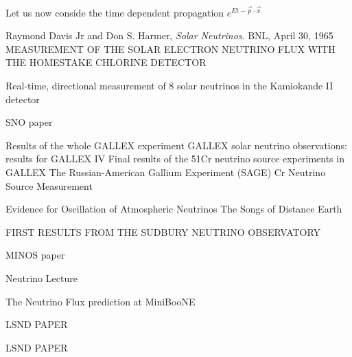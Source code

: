 \documentclass[12pt]{article}
\begin{document}
Let us now conside the time dependent propagation 
$e^{Et - \vec{p}\cdot\vec{x}}$


\begin{thebibliography}{10} %
  Raymond Davis Jr and Don S. Harmer,
  \emph{Solar Neutrinos}.
  BNL,
  April 30, 1965
  MEASUREMENT OF THE SOLAR ELECTRON NEUTRINO FLUX WITH THE HOMESTAKE
  CHLORINE DETECTOR
  
  Real-time, directional measurement of 8 solar neutrinos in the Kamiokande II detector

  SNO paper

	Results of the whole GALLEX experiment 
	GALLEX solar neutrino observations: results for GALLEX IV
	Final results of the 51Cr neutrino source experiments in GALLEX
The Russian-American Gallium Experiment (SAGE) Cr Neutrino Source Measurement

Evidence for Oscillation of Atmospheric Neutrinos
The Songs of Distance Earth

FIRST RESULTS FROM THE SUDBURY NEUTRINO OBSERVATORY

MINOS paper

Neutrino Lecture

The Neutrino Flux prediction at MiniBooNE

LSND PAPER

LSND PAPER

\end{thebibliography}
\end{document}
